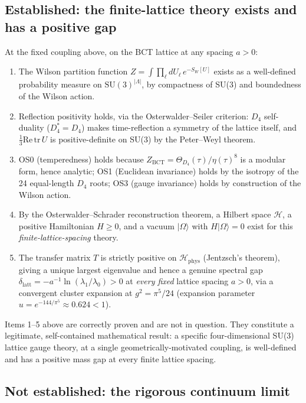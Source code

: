 \documentclass[twocolumn,10pt,a4paper]{article}
\begin{document}
\subsection{Established: the finite-lattice theory exists and has a positive
gap}
At the fixed coupling above, on the BCT lattice at any spacing $a>0$:
\begin{enumerate}[leftmargin=*]
\item The Wilson partition function $Z=\int\!\prod_\ell dU_\ell\,e^{-S_W[U]}$
exists as a well-defined probability measure on $\mathrm{SU}(3)^{|\Lambda|}$,
by compactness of SU(3) and boundedness of the Wilson action.
\item Reflection positivity holds, via the Osterwalder--Seiler criterion:
$D_4$ self-duality ($D_4^*=D_4$) makes time-reflection a symmetry of the
lattice itself, and $\tfrac13\mathrm{Re}\,\mathrm{tr}\,U$ is positive-definite
on SU(3) by the Peter--Weyl theorem.
\item OS0 (temperedness) holds because $Z_{\mathrm{BCT}}=\Theta_{D_4}(\tau)/\eta(\tau)^8$
is a modular form, hence analytic; OS1 (Euclidean invariance) holds by the
isotropy of the 24 equal-length $D_4$ roots; OS3 (gauge invariance) holds by
construction of the Wilson action.
\item By the Osterwalder--Schrader reconstruction theorem, a Hilbert space
$\mathcal H$, a positive Hamiltonian $H\ge0$, and a vacuum $|\Omega\rangle$
with $H|\Omega\rangle=0$ exist for this \emph{finite-lattice-spacing} theory.
\item The transfer matrix $T$ is strictly positive on $\mathcal H_{\mathrm{phys}}$
(Jentzsch's theorem), giving a unique largest eigenvalue and hence a genuine
spectral gap $\delta_{\mathrm{latt}}=-a^{-1}\ln(\lambda_1/\lambda_0)>0$ at
\emph{every fixed} lattice spacing $a>0$, via a convergent cluster expansion
at $g^2=\pi^5/24$ (expansion parameter $u=e^{-144/\pi^5}\approx0.624<1$).
\end{enumerate}
Items 1--5 above are correctly proven and are not in question. They
constitute a legitimate, self-contained mathematical result: a specific
four-dimensional SU(3) lattice gauge theory, at a single geometrically-motivated
coupling, is well-defined and has a positive mass gap at every finite lattice
spacing.

\subsection{Not established: the rigorous continuum limit}
\end{document}
